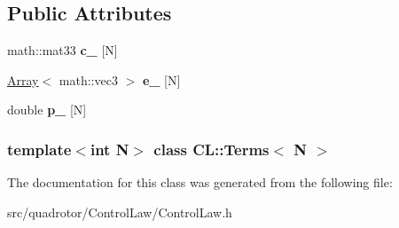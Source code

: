 \subsection*{Public Attributes}
\begin{DoxyCompactItemize}
\item 
\hypertarget{classCL_1_1Terms_a140440a957456b8a1444dec9398ebb6e}{
math::mat33 {\bfseries c\_\-} \mbox{[}N\mbox{]}}
\label{classCL_1_1Terms_a140440a957456b8a1444dec9398ebb6e}

\item 
\hypertarget{classCL_1_1Terms_aea3a6c9598212abff50042ffc62c6616}{
\hyperlink{classArray}{Array}$<$ math::vec3 $>$ {\bfseries e\_\-} \mbox{[}N\mbox{]}}
\label{classCL_1_1Terms_aea3a6c9598212abff50042ffc62c6616}

\item 
\hypertarget{classCL_1_1Terms_aa45b4ef4e3452c250ae7c7132f0cdde7}{
double {\bfseries p\_\-} \mbox{[}N\mbox{]}}
\label{classCL_1_1Terms_aa45b4ef4e3452c250ae7c7132f0cdde7}

\end{DoxyCompactItemize}
\subsubsection*{template$<$int N$>$ class CL::Terms$<$ N $>$}



The documentation for this class was generated from the following file:\begin{DoxyCompactItemize}
\item 
src/quadrotor/ControlLaw/ControlLaw.h\end{DoxyCompactItemize}
